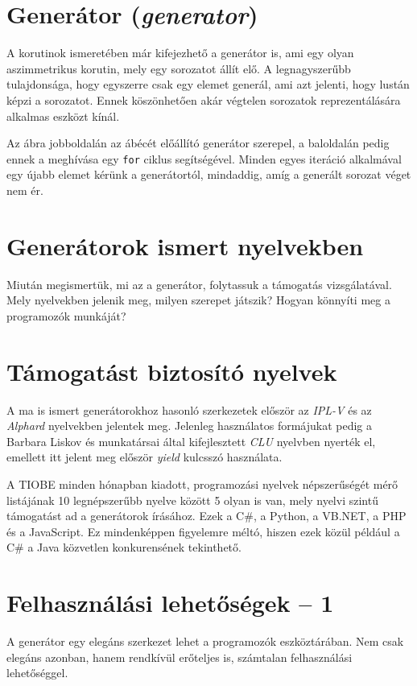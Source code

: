 \documentclass[12pt, a4paper]{article}
\begin{document}
\section{Generátor (\textit{generator})}

A korutinok ismeretében már kifejezhető a generátor is, ami egy olyan aszimmetrikus korutin, mely egy sorozatot állít elő. A legnagyszerűbb tulajdonsága, hogy egyszerre csak egy elemet generál, ami azt jelenti, hogy lustán képzi a sorozatot. Ennek köszönhetően akár végtelen sorozatok reprezentálására alkalmas eszközt kínál. 

Az ábra jobboldalán az ábécét előállító generátor szerepel, a baloldalán pedig ennek a meghívása egy \texttt{for} ciklus segítségével. Minden egyes iteráció alkalmával egy újabb elemet kérünk a generátortól, mindaddig, amíg a generált sorozat véget nem ér.

\section{Generátorok ismert nyelvekben}

Miután megismertük, mi az a generátor, folytassuk a támogatás vizsgálatával. Mely nyelvekben jelenik meg, milyen szerepet játszik? Hogyan könnyíti meg a programozók munkáját?

\section{Támogatást biztosító nyelvek}

A ma is ismert generátorokhoz hasonló szerkezetek először az \textit{IPL-V} és az \textit{Alphard} nyelvekben jelentek meg. Jelenleg használatos formájukat pedig a Barbara Liskov és munkatársai által kifejlesztett \textit{CLU} nyelvben nyerték el, emellett itt jelent meg először \textit{yield} kulcsszó használata.

A TIOBE minden hónapban kiadott, programozási nyelvek népszerűségét mérő listájának 10 legnépszerűbb nyelve között 5 olyan is van, mely nyelvi szintű támogatást ad a generátorok írásához. Ezek a C\#, a Python, a VB.NET, a PHP és a JavaScript. Ez mindenképpen figyelemre méltó, hiszen ezek közül például a C\# a Java közvetlen konkurensének tekinthető.

\section{Felhasználási lehetőségek -- 1}

A generátor egy elegáns szerkezet lehet a programozók eszköztárában. Nem csak elegáns azonban, hanem rendkívül erőteljes is, számtalan felhasználási lehetőséggel.
\end{document}
